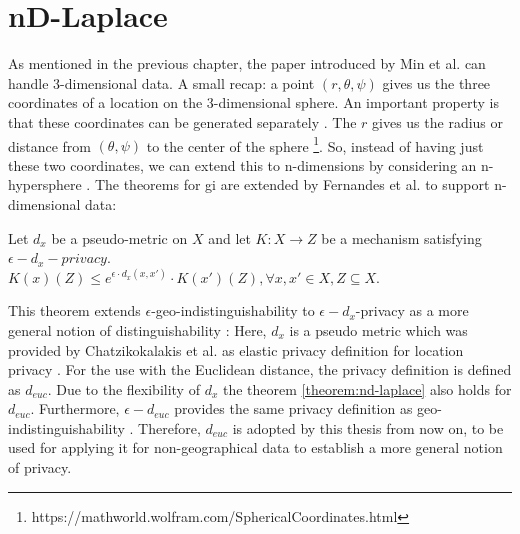 \section{nD-Laplace}
As mentioned in the previous chapter, the paper introduced by Min et al. can handle 3-dimensional data.
A small recap: a point $(r, \theta, \psi)$ gives us the three coordinates of a location on the 3-dimensional sphere.
An important property is that these coordinates can be generated separately \citep{DBLP:journals/corr/abs-1212-1984, 9646489}.
The $r$ gives us the radius or distance from $(\theta, \psi)$ to the center of the sphere \footnote{https://mathworld.wolfram.com/SphericalCoordinates.html}.
So, instead of having just these two coordinates, we can extend this to n-dimensions by considering an n-hypersphere \citep{fernandes_generalised_2019, 9646489}.
The theorems for \gls{gi} are extended by Fernandes et al. to support n-dimensional data:
\begin{theorem}
  Let $d_x$ be a pseudo-metric on $X$ and let $K: X \rightarrow Z$ be a mechanism satisfying $\epsilon-d_x-privacy$. \\
  $K(x)(Z) \leq e^{\epsilon \cdot d_x (x, x')} \cdot K(x')(Z), \forall x, x' \in X, Z \subseteq X$.
  \label{theorem:nd-laplace}
\end{theorem}
This theorem extends $\epsilon$-geo-indistinguishability to $\epsilon-d_x$-privacy as a more general notion of distinguishability \citep{fernandes_generalised_2019}:
Here, $d_x$ is a pseudo metric which was provided by Chatzikokalakis et al. as elastic privacy definition for location privacy \citep{chatzikokolakis_constructing_2015}. For the use with the Euclidean distance, the privacy definition is defined as $d_{euc}$. Due to the flexibility of $d_x$ the theorem \ref{theorem:nd-laplace} also holds for $d_{euc}$.  Furthermore, $\epsilon-d_{euc}$ provides the same privacy definition as geo-indistinguishability \citep{chatzikokolakis_constructing_2015}.
Therefore, $d_{euc}$ is adopted by this thesis from now on, to be used for applying it for non-geographical data to establish a more general notion of privacy. \newline

